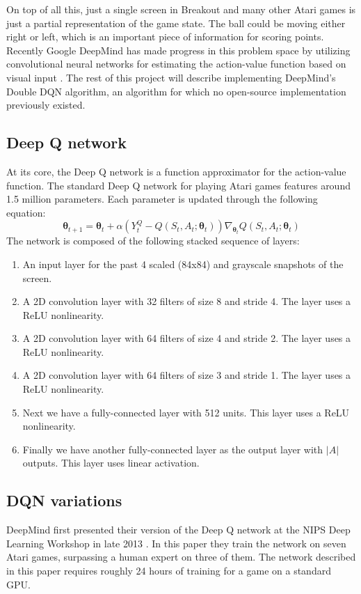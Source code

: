 \documentclass{article}
\begin{document}
  On top of all this, just a single screen in Breakout and many other Atari games is just a partial representation of the game state. The ball could be moving either right or left, which is an important piece of information for scoring points. \\

  Recently Google DeepMind has made progress in this problem space by utilizing convolutional neural networks for estimating the action-value function based on visual input \cite{dmnips}. The rest of this project will describe implementing DeepMind's Double DQN algorithm, an algorithm for which no open-source implementation previously existed.
\subsection{Deep Q network}
  At its core, the Deep Q network is a function approximator for the action-value function. The standard Deep Q network for playing Atari games features around 1.5 million parameters. Each parameter is updated through the following equation:
  \[ \boldsymbol{\theta}_{t+1} = \boldsymbol{\theta}_t+\alpha(Y_t^Q-Q(S_t,A_t;\boldsymbol{\theta}_t))\nabla_{\boldsymbol{\theta}_t}Q(S_t,A_t;\boldsymbol{\theta}_t) \]
  The network is composed of the following stacked sequence of layers:
  \begin{enumerate}
    \item An input layer for the past 4 scaled (84x84) and grayscale snapshots of the screen.
    \item A 2D convolution layer with 32 filters of size 8 and stride 4. The layer uses a ReLU nonlinearity.
    \item A 2D convolution layer with 64 filters of size 4 and stride 2. The layer uses a ReLU nonlinearity.
    \item A 2D convolution layer with 64 filters of size 3 and stride 1. The layer uses a ReLU nonlinearity.
    \item Next we have a fully-connected layer with 512 units. This layer uses a ReLU nonlinearity.
    \item Finally we have another fully-connected layer as the output layer with $|A|$ outputs. This layer uses linear activation.
  \end{enumerate}

\subsection{DQN variations}
DeepMind first presented their version of the Deep Q network at the NIPS Deep Learning Workshop in late 2013 \cite{dmnips}. In this paper they train the network on seven Atari games, surpassing a human expert on three of them. The network described in this paper requires roughly 24 hours of training for a game on a standard GPU.\\
\end{document}
